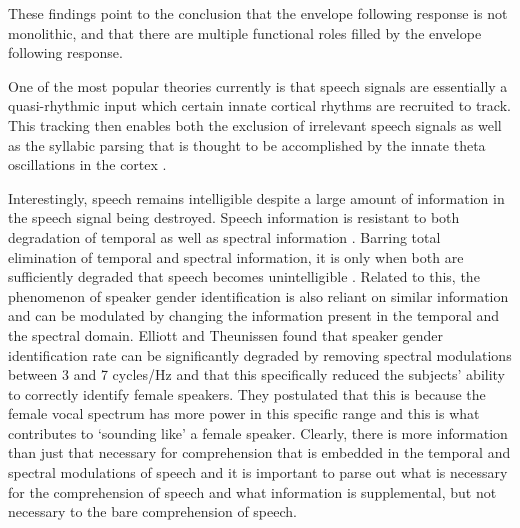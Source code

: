 \documentclass[titlepage]{article}
\begin{document}
    These findings point to the conclusion that the envelope following response
    is not monolithic, and that there are multiple functional roles filled by
    the envelope following response.

    One of the most popular theories currently is that speech signals are
    essentially a quasi-rhythmic input which certain innate cortical rhythms are
    recruited to track. This tracking then enables both the exclusion of
    irrelevant speech signals \cite{Horton2014,OSullivan2015} as well as the
    syllabic parsing that is thought to be accomplished by the innate theta
    oscillations in the cortex \cite{Doelling2014,Ghitza2013b}.

    Interestingly, speech remains intelligible despite a large amount of
    information in the speech signal being destroyed. Speech information is
    resistant to both degradation of temporal as well as spectral information
    \cite{Silipo1999,Drullman1994}. Barring total elimination of temporal and
    spectral information, it is only when both are sufficiently degraded that
    speech becomes unintelligible \cite{Elliott2009}. Related to this, the
    phenomenon of speaker gender identification is also reliant on similar
    information and can be modulated by changing the information present in the
    temporal and the spectral domain. Elliott and Theunissen \cite{Elliott2009}
    found that speaker gender identification rate can be significantly
    degraded by removing spectral modulations between 3 and 7 cycles/Hz and that
    this specifically reduced the subjects' ability to correctly identify
    female speakers. They postulated that this is because the female vocal
    spectrum has more power in this specific range and this is what
    contributes to `sounding like' a female speaker. Clearly, there is more
    information than just that necessary for comprehension that is embedded
    in the temporal and spectral modulations of speech and it is important to
    parse out what is necessary for the comprehension of speech and what
    information is supplemental, but not necessary to the bare comprehension
    of speech.
\end{document}
